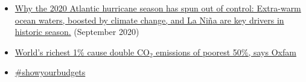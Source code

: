 \documentclass[12pt]{article}
\begin{document}
\begin{itemize}
 \vspace{-.2cm} \item \href{https://www.washingtonpost.com/weather/2020/09/23/atlantic-hurricanes-record-2020/?utm_campaign=Carbon%20Brief%20Daily%20Briefing&utm_medium=email&utm_source=Revue%20newsletter}{Why the 2020 Atlantic hurricane season has spun out of control: Extra-warm ocean waters, boosted by climate change, and La Ni{\~n}a are key drivers in historic season.} (September 2020)
 \vspace{-.2cm} \item \href{https://www.theguardian.com/environment/2020/sep/21/worlds-richest-1-cause-double-co2-emissions-of-poorest-50-says-oxfam?utm_campaign=Carbon%20Brief%20Daily%20Briefing&utm_medium=email&utm_source=Revue%20newsletter}{World's richest 1\% cause double CO$_2$ emissions of poorest 50\%, says Oxfam} 
 \vspace{-.2cm} \item \href{https://www.showyourbudgets.org/de/?country=whole_world}{\#showyourbudgets} 
 \end{itemize}

 
\end{document}
